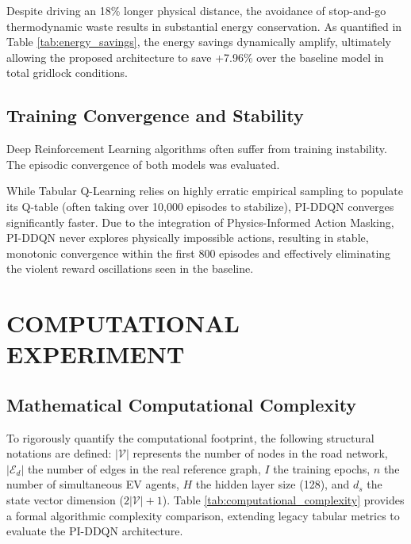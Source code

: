 \documentclass[journal, a4paper, twocolumn]{IEEEtran}
\begin{document}
Despite driving an 18\% longer physical distance, the avoidance of stop-and-go thermodynamic waste results in substantial energy conservation. As quantified in Table \ref{tab:energy_savings}, the energy savings dynamically amplify, ultimately allowing the proposed architecture to save +7.96\% over the baseline model in total gridlock conditions.

\subsection{Training Convergence and Stability}
Deep Reinforcement Learning algorithms often suffer from training instability. The episodic convergence of both models was evaluated.

While Tabular Q-Learning relies on highly erratic empirical sampling to populate its Q-table (often taking over 10,000 episodes to stabilize), PI-DDQN converges significantly faster. Due to the integration of Physics-Informed Action Masking, PI-DDQN never explores physically impossible actions, resulting in stable, monotonic convergence within the first 800 episodes and effectively eliminating the violent reward oscillations seen in the baseline.

\section{COMPUTATIONAL EXPERIMENT}
\label{sec:computational}

\subsection{Mathematical Computational Complexity}
To rigorously quantify the computational footprint, the following structural notations are defined: $|\mathcal{V}|$ represents the number of nodes in the road network, $|\mathcal{E}_d|$ the number of edges in the real reference graph, $I$ the training epochs, $n$ the number of simultaneous EV agents, $H$ the hidden layer size (128), and $d_s$ the state vector dimension ($2|\mathcal{V}| + 1$). Table \ref{tab:computational_complexity} provides a formal algorithmic complexity comparison, extending legacy tabular metrics to evaluate the PI-DDQN architecture.
\end{document}
